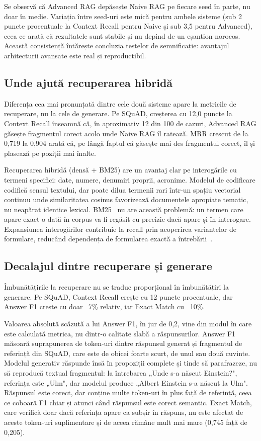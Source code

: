 Se observă că Advanced RAG depășește Naive RAG pe fiecare seed în parte, nu doar în medie. Variația între seed-uri este mică pentru ambele sisteme (sub 2 puncte procentuale la Context Recall pentru Naive și sub 3,5 pentru Advanced), ceea ce arată că rezultatele sunt stabile și nu depind de un eșantion norocos. Această consistență întărește concluzia testelor de semnificație: avantajul arhitecturii avansate este real și reproductibil.

\subsection{Unde ajută recuperarea hibridă}

Diferența cea mai pronunțată dintre cele două sisteme apare la metricile de recuperare, nu la cele de generare. Pe SQuAD, creșterea cu 12,0 puncte la Context Recall înseamnă că, în aproximativ 12 din 100 de cazuri, Advanced RAG găsește fragmentul corect acolo unde Naive RAG îl ratează. MRR crescut de la 0,719 la 0,904 arată că, pe lângă faptul că găsește mai des fragmentul corect, îl și plasează pe poziții mai înalte.

Recuperarea hibridă (densă + BM25) are un avantaj clar pe interogările cu termeni specifici: date, numere, denumiri proprii, acronime. Modelul de codificare codifică sensul textului, dar poate dilua termenii rari într-un spațiu vectorial continuu unde similaritatea cosinus favorizează documentele apropiate tematic, nu neapărat identice lexical. BM25~\cite{robertson2009bm25} nu are această problemă: un termen care apare exact o dată în corpus va fi regăsit cu precizie dacă apare și în interogare. Expansiunea interogărilor contribuie la recall prin acoperirea variantelor de formulare, reducând dependența de formularea exactă a întrebării~\cite{gao2024retrievalaugmentedgenerationlargelanguage}.

\subsection{Decalajul dintre recuperare și generare}

Îmbunătățirile la recuperare nu se traduc proporțional în îmbunătățiri la generare. Pe SQuAD, Context Recall crește cu 12 puncte procentuale, dar Answer F1 crește cu doar ~7\% relativ, iar Exact Match cu ~10\%.

Valoarea absolută scăzută a lui Answer F1, în jur de 0,2, vine din modul în care este calculată metrica, nu dintr-o calitate slabă a răspunsurilor. Answer F1 măsoară suprapunerea de token-uri dintre răspunsul generat și fragmentul de referință din SQuAD, care este de obicei foarte scurt, de unul sau două cuvinte. Modelul generativ răspunde însă în propoziții complete și tinde să parafrazeze, nu să reproducă textual fragmentul: la întrebarea „Unde s-a născut Einstein?", referința este „Ulm", dar modelul produce „Albert Einstein s-a născut la Ulm". Răspunsul este corect, dar conține multe token-uri în plus față de referință, ceea ce coboară F1 chiar și atunci când răspunsul este corect semantic. Exact Match, care verifică doar dacă referința apare ca subșir în răspuns, nu este afectat de aceste token-uri suplimentare și de aceea rămâne mult mai mare (0,745 față de 0,205).

